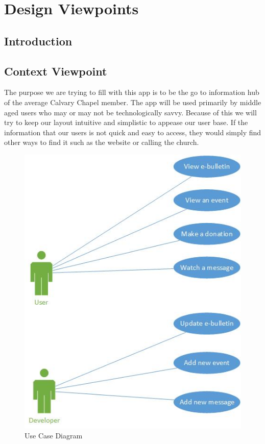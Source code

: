 \documentclass[letterpaper,10pt,draftclsnofoot,onecolumn,titlepage]{IEEEtran}
\begin{document}
	\section{Design Viewpoints}
	
		\subsection{Introduction}
		
		\subsection{Context Viewpoint}
		The purpose we are trying to fill with this app is to be the go to information hub of the average Calvary Chapel member. 
		The app will be used primarily by middle aged users who may or may not be technologically savvy. 
		Because of this we will try to keep our layout intuitive and simplistic to appease our user base. 
		If the information that our users is not quick and easy to access, they would simply find other ways to find it such as the website or calling the church.
		
		\begin{figure}[H]
			\centering
			\includegraphics{UseCase.jpg}
			\caption{Use Case Diagram}
			\label{fig:usecase1}
		\end{figure}
	
\end{document}
